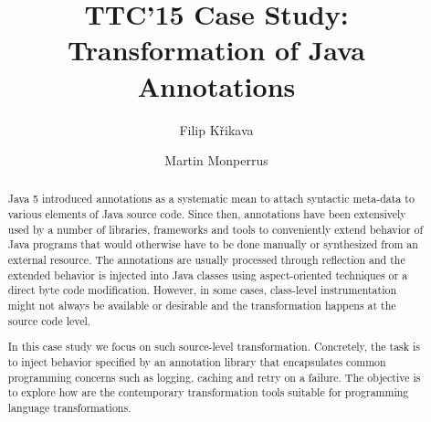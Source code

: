 \documentclass{eptcs}
\title{TTC'15 Case Study: Transformation of Java Annotations}
\author{
  Filip Křikava
  \institute{INRIA Lille}
  \institute{France}
  \email{\href{mailto:filip.krikava@inria.fr}{filip.krikava@inria.fr}}
\and
  Martin Monperrus
  \institute{University Lille 1 / INRIA Lille}
  \institute{France}
  \email{\href{mailto:martin.monperrus@univ-lille1.fr}{martin.monperrus@univ-lille1.fr}}
}
\begin{document}
\maketitle

\begin{abstract}

Java 5 introduced annotations as a systematic mean to attach syntactic meta-data to various elements of Java source code.
Since then, annotations have been extensively used by a number of libraries, frameworks and tools to conveniently extend behavior of Java programs that would otherwise have to be done manually or synthesized from an external resource.
The annotations are usually processed through reflection and the extended behavior is injected into Java classes using aspect-oriented techniques or a direct byte code modification.
However, in some cases, class-level instrumentation might not always be available or desirable and the transformation happens at the source code level.

In this case study we focus on such source-level transformation.
Concretely, the task is to inject behavior specified by an annotation library that encapsulates common programming concerns such as logging, caching and retry on a failure.
The objective is to explore how are the contemporary transformation tools suitable for programming language transformations.
\end{abstract}






	

\appendix


\end{document}
